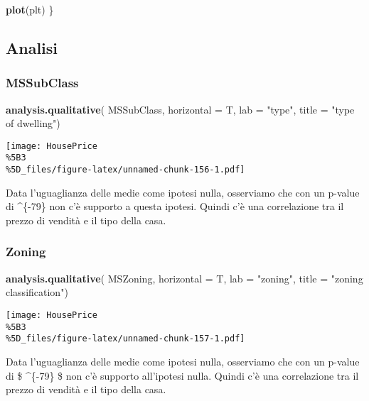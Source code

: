 \documentclass[
]{article}
\newenvironment{Shaded}{\begin{snugshade}}{\end{snugshade}}
\newcommand{\AttributeTok}[1]{\textcolor[rgb]{0.13,0.29,0.53}{#1}}
\newcommand{\FunctionTok}[1]{\textcolor[rgb]{0.13,0.29,0.53}{\textbf{#1}}}
\newcommand{\NormalTok}[1]{#1}
\newcommand{\StringTok}[1]{\textcolor[rgb]{0.31,0.60,0.02}{#1}}
\begin{document}
\begin{Shaded}
\begin{Highlighting}[]
    \FunctionTok{plot}\NormalTok{(plt)}
\NormalTok{\}}
\end{Highlighting}
\end{Shaded}

\subsection{Analisi}\label{analisi-2}

\subsubsection{MSSubClass}\label{mssubclass-1}

\begin{Shaded}
\begin{Highlighting}[]
\FunctionTok{analysis.qualitative}\NormalTok{(}
\NormalTok{    MSSubClass,}
    \AttributeTok{horizontal =}\NormalTok{ T,}
    \AttributeTok{lab =} \StringTok{"type"}\NormalTok{,}
    \AttributeTok{title =} \StringTok{"type of dwelling"}\NormalTok{)}
\end{Highlighting}
\end{Shaded}

\texttt{[image: HousePrice\\\%5B3\\\%5D\_files/figure-latex/unnamed-chunk-156-1.pdf]}

Data l'uguaglianza delle medie come ipotesi nulla, osserviamo che con un
p-value di \^{}\{-79\} non c'è supporto a questa ipotesi.
Quindi c'è una correlazione tra il prezzo di vendità e il tipo della
casa.

\subsubsection{Zoning}\label{zoning-1}

\begin{Shaded}
\begin{Highlighting}[]
\FunctionTok{analysis.qualitative}\NormalTok{(}
\NormalTok{    MSZoning,}
    \AttributeTok{horizontal =}\NormalTok{ T,}
    \AttributeTok{lab =} \StringTok{"zoning"}\NormalTok{,}
    \AttributeTok{title =} \StringTok{"zoning classification"}\NormalTok{)}
\end{Highlighting}
\end{Shaded}

\texttt{[image: HousePrice\\\%5B3\\\%5D\_files/figure-latex/unnamed-chunk-157-1.pdf]}

Data l'uguaglianza delle medie come ipotesi nulla, osserviamo che con un
p-value di \$ \^{}\{-79\} \$ non c'è supporto all'ipotesi
nulla. Quindi c'è una correlazione tra il prezzo di vendità e il tipo
della casa.
\end{document}
